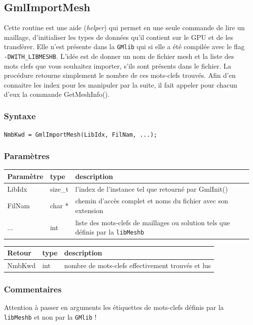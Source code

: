 \documentclass[a4paper,12pt]{article}
\begin{document}
\subsection{GmlImportMesh}

Cette routine est une aide (\emph{helper}) qui permet en une seule commande de lire un maillage, d'initialiser les types de données qu'il contient sur le GPU et de les transférer.
Elle n'est présente dans la {\tt GMlib} qui si elle a été compilée avec le flag {\tt -DWITH\_LIBMESHB}.
L'idée est de donner un nom de fichier mesh et la liste des mots clefs que vous souhaitez importer, s'ils sont présents dans le fichier.
La procédure retourne simplement le nombre de ces mots-clefs trouvés.
Afin d'en connaitre les index pour les manipuler par la suite, il fait appeler pour chacun d'eux la commande GetMeshInfo().

\subsubsection*{Syntaxe}

{\tt NmbKwd = GmlImportMesh(LibIdx, FilNam, ...);}

\subsubsection*{Paramètres}

\begin{tabular}{|m{2cm}|m{1.5cm}|m{10.5cm}|}
\hline
Paramètre  & type    & description \\
\hline
LibIdx     & size\_t & l'index de l'instance tel que retourné par GmlInit() \\
\hline
FilNam     & char *  & chemin d'accès complet et noms du fichier avec son extension \\
\hline
...        & int     & liste des mots-clefs de maillages ou solution tels que définis par la {\tt libMeshb} \\
\hline
\end{tabular}

\medskip

\begin{tabular}{|m{2cm}|m{1.5cm}|m{10.5cm}|}
\hline
Retour     & type   & description \\
\hline
NmbKwd     & int    & nombre de mots-clefs effectivement trouvés et lus \\
\hline
\end{tabular}

\subsubsection*{Commentaires}
Attention à passer en arguments les étiquettes de mots-clefs définis par la {\tt libMeshb} et non par la {\tt GMlib} !
\end{document}
